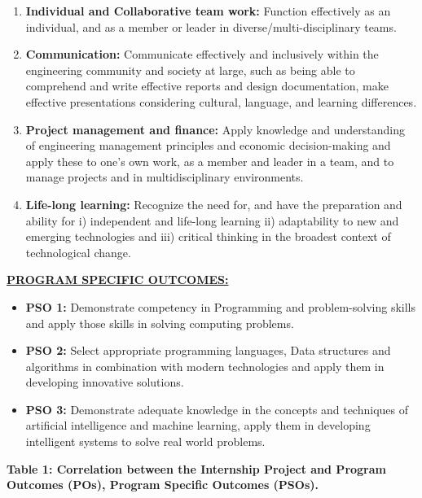 \newpage
\thispagestyle{fancy}

\begin{enumerate}[resume, leftmargin=2.0em, itemsep=6pt]
    \item \textbf{Individual and Collaborative team work:} Function effectively as an individual, and as a member or leader in diverse/multi-disciplinary teams.
    \item \textbf{Communication:} Communicate effectively and inclusively within the engineering community and society at large, such as being able to comprehend and write effective reports and design documentation, make effective presentations considering cultural, language, and learning differences.
    \item \textbf{Project management and finance:} Apply knowledge and understanding of engineering management principles and economic decision-making and apply these to one's own work, as a member and leader in a team, and to manage projects and in multidisciplinary environments.
    \item \textbf{Life-long learning:} Recognize the need for, and have the preparation and ability for i) independent and life-long learning ii) adaptability to new and emerging technologies and iii) critical thinking in the broadest context of technological change.
\end{enumerate}

\vspace{0.4cm}
\noindent \textbf{\underline{PROGRAM SPECIFIC OUTCOMES:}}
\begin{itemize}[leftmargin=2.0em, itemsep=6pt]
    \item \textbf{PSO 1:} Demonstrate competency in Programming and problem-solving skills and apply those skills in solving computing problems.
    \item \textbf{PSO 2:} Select appropriate programming languages, Data structures and algorithms in combination with modern technologies and apply them in developing innovative solutions.
    \item \textbf{PSO 3:} Demonstrate adequate knowledge in the concepts and techniques of artificial intelligence and machine learning, apply them in developing intelligent systems to solve real world problems.
\end{itemize}

\newpage
\thispagestyle{fancy}

\noindent \textbf{Table 1: Correlation between the Internship Project and Program Outcomes (POs), Program Specific Outcomes (PSOs).}


